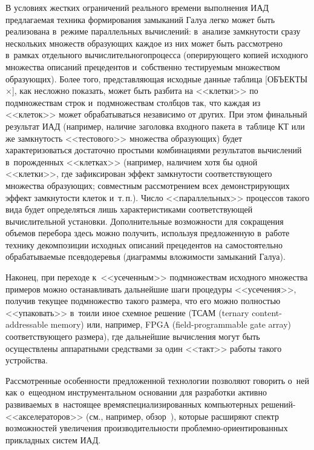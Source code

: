 \begin{multicols}{2}
    В условиях жестких ограничений реального времени выполнения ИАД 
предлагаемая техника формирования замыканий Галуа легко может быть 
реализована в~режиме параллельных вычислений: в~анализе замкнутости 
сразу нескольких множеств\linebreak
 образующих каждое из них может быть 
рас\-смотре\-но в~рамках отдельного вычислительного\linebreak процесса (оперирующего 
копией исходного множества описаний прецедентов и~собственно 
тестируемым множеством образующих). Более того, представляющая 
исходные данные таблица [{\small ОБЪЕКТЫ}\;$\times$], как 
несложно показать, может быть разбита на <<клетки>> по подмножествам 
строк и~подмножествам столбцов так, что каждая из <<клеток>> может 
обрабатываться независимо от других. При этом финальный результат ИАД 
(например, наличие заголовка входного пакета в~таблице КТ или же 
замкнутость <<тестового>> множества образующих) будет 
характеризоваться достаточно простыми комбинациями результатов 
вычислений в~порожденных <<клетках>> (например, наличием хотя бы 
одной <<клетки>>, где зафиксирован эффект замкнутости соответствующего 
множества образующих; совместным рассмотрением всех демонстрирующих 
эффект замкнутости клеток и~т.\,п.). Число <<параллельных>> процессов 
такого вида будет определяться лишь характеристиками соответствующей 
вычислительной установки. Дополнительные возможности для сокращения 
объемов перебора здесь можно получить, используя предложенную 
в~работе~\cite{8-zab} технику декомпозиции исходных описаний 
прецедентов на самостоятельно обрабатываемые псевдодеревья (диаграммы 
вложимости замыканий Галуа).
    
    Наконец, при переходе к~<<усеченным>> подмножествам исходного 
множества примеров можно останавливать дальнейшие шаги процедуры 
<<усечения>>, получив текущее подмножество такого размера, что его 
можно полностью <<упаковать>> в~то\linebreak или иное схемное решение (ТСАМ  (ternary content-addressable
memory)
или, например, FPGA (field-programmable gate array)
соответствующего размера), где дальнейшие 
вычисления могут быть осуществле\-ны аппаратными средствами за один 
<<такт>> работы такого устрой\-ства.

    
    Рассмотренные особенности предложенной технологии позволяют 
говорить о~ней как о~еще\linebreak одном инструментальном основании для раз\-ра\-ботки 
активно развиваемых в~настоящее время\linebreak специализированных компьютерных 
ре\-ше\-ний-<<ак\-се\-ле\-ра\-то\-ров>> (см., например, обзор~\cite{9-zab}), которые 
расширяют спектр возможностей увеличения производительности 
проб\-лем\-но-ори\-ен\-ти\-ро\-ван\-ных прикладных систем ИАД.


\end{multicols}
